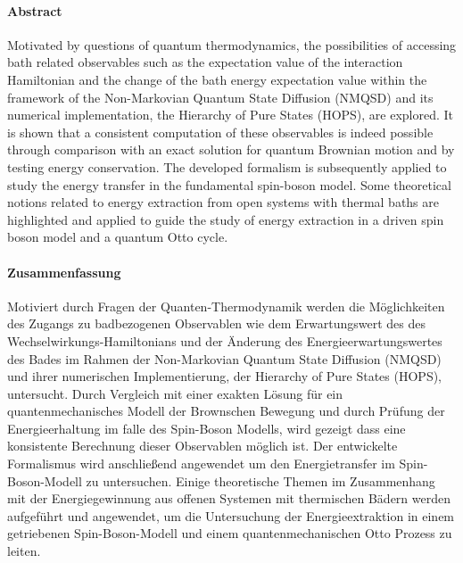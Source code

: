 \paragraph{Abstract}

Motivated by questions of quantum thermodynamics, the possibilities of
accessing bath related observables such as the expectation value of
the interaction Hamiltonian and the change of the bath energy
expectation value within the framework of the Non-Markovian Quantum
State Diffusion (NMQSD) and its numerical implementation, the
Hierarchy of Pure States (HOPS), are explored. It is shown that a
consistent computation of these observables is indeed possible through
comparison with an exact solution for quantum Brownian motion and by
testing energy conservation.  The developed formalism is subsequently
applied to study the energy transfer in the fundamental spin-boson
model. Some theoretical notions related to energy extraction from open
systems with thermal baths are highlighted and applied to guide the
study of energy extraction in a driven spin boson model and a quantum
Otto cycle.


\paragraph{Zusammenfassung}


Motiviert durch Fragen der Quanten-Thermodynamik werden die
Möglichkeiten des Zugangs zu badbezogenen Observablen wie dem
Erwartungswert des des Wechselwirkungs-Hamiltonians und der Änderung
des Energieerwartungswertes des Bades im Rahmen der Non-Markovian
Quantum State Diffusion (NMQSD) und ihrer numerischen Implementierung,
der Hierarchy of Pure States (HOPS), untersucht.  Durch Vergleich mit
einer exakten Lösung für ein quantenmechanisches Modell der Brownschen
Bewegung und durch Prüfung der Energieerhaltung im falle des
Spin-Boson Modells, wird gezeigt dass eine konsistente Berechnung
dieser Observablen möglich ist.  Der entwickelte Formalismus wird
anschließend angewendet um den Energietransfer im Spin-Boson-Modell zu
untersuchen. Einige theoretische Themen im Zusammenhang mit der
Energiegewinnung aus offenen Systemen mit thermischen Bädern werden
aufgef\"uhrt und angewendet, um die Untersuchung der Energieextraktion
in einem getriebenen Spin-Boson-Modell und einem quantenmechanischen
Otto Prozess zu leiten.
